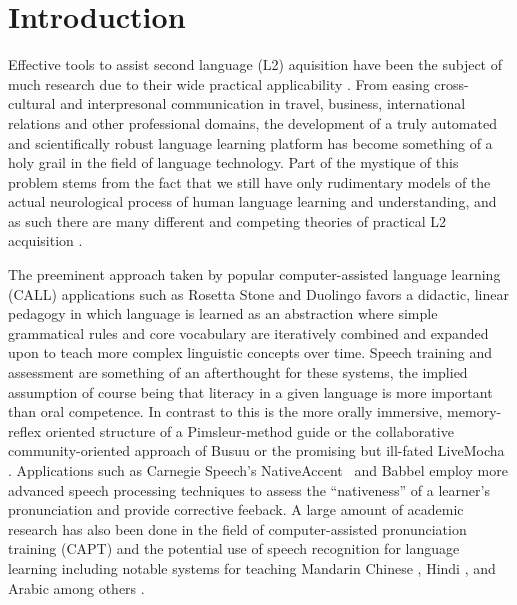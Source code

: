 \section{Introduction}
Effective tools to assist second language (L2) aquisition have been the subject of much research due to their wide practical applicability \cite{higgins1983computer} \cite{levy1997computer} \cite{hubbard2008call}. From easing cross-cultural and interpresonal communication in travel, business, international relations and other professional domains, the development of a truly automated and scientifically robust language learning platform has become something of a holy grail in the field of language technology. Part of the mystique of this problem stems from the fact that we still have only rudimentary models of the actual neurological process of human language learning and understanding, and as such there are many different and competing theories of practical L2 acquisition \cite{pedersenfar} \cite{mitchell2013second}. 

The preeminent approach taken by popular computer-assisted language learning (CALL) applications such as Rosetta Stone \cite{vesselinov2009measuring} and Duolingo \cite{vesselinov2012duolingo} \cite{von2013duolingo} favors a didactic, linear pedagogy in which language is learned as an abstraction where simple grammatical rules and core vocabulary are iteratively combined and expanded upon to teach more complex linguistic concepts over time. Speech training and assessment are something of an afterthought for these systems, the implied assumption of course being that literacy in a given language is more important than oral competence. In contrast to this is the more orally immersive, memory-reflex oriented structure of a Pimsleur-method guide \cite{pimsleur2013learn} \cite{pimsleur1966testing} \cite{pimsleur1971psychology} \cite{godwin2010emerging} or the collaborative community-oriented approach of Busuu \cite{pino2011busuu} \cite{ketyi2013using} or the promising but ill-fated LiveMocha \cite{jee2009livemocha} \cite{liaw2011review}. Applications such as Carnegie Speech's NativeAccent\textregistered \ \cite{eskenazi2007nativeaccenttm} and Babbel employ more advanced speech processing techniques to assess the ``nativeness'' of a learner's pronunciation and provide corrective feeback. A large amount of academic research has also been done in the field of computer-assisted pronunciation training (CAPT) and the potential use of speech recognition for language learning \cite{franco1997automatic} \cite{minematsu2004pronunciation} \cite{van2016evaluating} \cite{mccrocklin2016pronunciation} \cite{leepersonalized} \cite{cincarek2009automatic} \cite{kim1997automatic} \cite{wolfeapplause} including notable systems for teaching Mandarin Chinese \cite{chen2004automatic} \cite{huimproved}, Hindi \cite{patil2016detection}, and Arabic \cite{maqsood2016complete} among others \cite{cucchiarini1997automatic} \cite{bernstein1990automatic}. 

